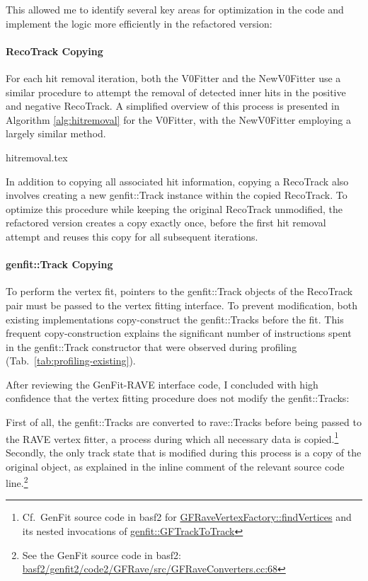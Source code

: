 This allowed me to identify several key areas for optimization in the code and implement the logic more efficiently in the refactored version:


\paragraph{RecoTrack Copying}
For each hit removal iteration, both the V0Fitter and the NewV0Fitter use a similar procedure to attempt the removal of detected inner hits in the positive and negative RecoTrack.
A simplified overview of this process is presented in Algorithm \ref{alg:hitremoval} for the V0Fitter, with the NewV0Fitter employing a largely similar method.

\begin{algbox}{%
    \label{alg:hitremoval}%
  }
  {hitremoval.tex}
\end{algbox}

In addition to copying all associated hit information, copying a RecoTrack also involves creating a new genfit::Track instance within the copied RecoTrack.
To optimize this procedure while keeping the original RecoTrack unmodified, the refactored version creates a copy exactly once, before the first hit removal attempt and reuses this copy for all subsequent iterations.


\paragraph{genfit::Track Copying}
To perform the vertex fit, pointers to the genfit::Track objects of the RecoTrack pair must be passed to the vertex fitting interface.
To prevent modification, both existing implementations copy-construct the genfit::Tracks before the fit.
This frequent copy-construction explains the significant number of instructions spent in the genfit::Track constructor that were observed during profiling (Tab.\ \ref{tab:profiling-existing}).

After reviewing the GenFit-RAVE interface code, I concluded with high confidence that the vertex fitting procedure does not modify the genfit::Tracks:

First of all, the genfit::Tracks are converted to rave::Tracks before being passed to the RAVE vertex fitter, a process during which all necessary data is copied.\footnote{
  Cf.\ GenFit source code in basf2 for \href{https://github.com/belle2/basf2/blob/release-09-00-00/genfit2/code2/GFRave/include/GFRaveVertexFactory.h}{GFRaveVertexFactory::findVertices} and its nested invocations of \href{https://github.com/belle2/basf2/blob/release-09-00-00/genfit2/code2/GFRave/src/GFRaveConverters.cc}{genfit::GFTrackToTrack}
}
Secondly, the only track state that is modified during this process is a copy of the original object, as explained in the inline comment of the relevant source code line.\footnote{%
  See the GenFit source code in basf2: \href{https://github.com/belle2/basf2/blob/release-09-00-00/genfit2/code2/GFRave/src/GFRaveConverters.cc\#L68}{basf2/genfit2/code2/GFRave/src/GFRaveConverters.cc:68}
}


